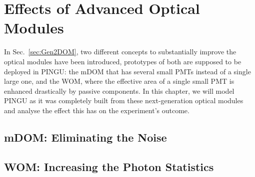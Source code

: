 \section{Effects of Advanced Optical Modules}
\label{sec:om_effects}

In Sec.~\ref{sec:Gen2DOM}, two different concepts to substantially improve the 
optical modules have been introduced, prototypes of both are supposed to be 
deployed in PINGU: the mDOM that has several small PMTs instead of a single 
large one, and the WOM, where the effective area of a single small PMT is 
enhanced drastically by passive components. In this chapter, we will model 
PINGU as it was completely built from these next-generation optical modules and 
analyse the effect this has on the experiment's outcome.

\subsection{mDOM: Eliminating the Noise}
\label{sec:mdom_effect}



\subsection{WOM: Increasing the Photon Statistics}
\label{sec:wom_effect}


